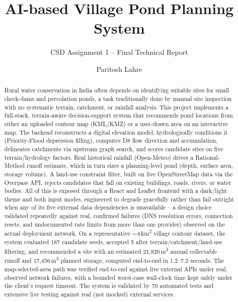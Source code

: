\documentclass[manuscript,screen]{acmart}
\begin{document}
\title{AI-based Village Pond Planning System}
\subtitle{CSD Assignment 1 -- Final Technical Report}

\author{Paritosh Lahre}

\renewcommand{\shortauthors}{Lahre}

\begin{abstract}
Rural water conservation in India often depends on identifying suitable
sites for small check-dams and percolation ponds, a task traditionally
done by manual site inspection with no systematic terrain, catchment, or
rainfall analysis. This project implements a full-stack, terrain-aware
decision-support system that recommends pond locations from either an
uploaded contour map (KML/KMZ) or a user-drawn area on an interactive map.
The backend reconstructs a digital elevation model, hydrologically
conditions it (Priority-Flood depression filling), computes D8 flow
direction and accumulation, delineates catchments via upstream graph
search, and scores candidate sites on five terrain/hydrology factors. Real
historical rainfall (Open-Meteo) drives a Rational-Method runoff estimate,
which in turn sizes a planning-level pond (depth, surface area, storage
volume). A land-use constraint filter, built on live OpenStreetMap data via
the Overpass API, rejects candidates that fall on existing buildings,
roads, rivers, or water bodies. All of this is exposed through a React and
Leaflet frontend with a dark/light theme and both input modes, engineered
to degrade gracefully rather than fail outright when any of its five
external data dependencies is unavailable -- a design choice validated
repeatedly against real, confirmed failures (DNS resolution errors,
connection resets, and undocumented rate limits from more than one
provider) observed on the actual deployment network. On a representative
$\sim$4\,km\textsuperscript{2} village contour dataset, the system
evaluated 187 candidate seeds, accepted 5 after terrain/catchment/land-use
filtering, and recommended a site with an estimated 21{,}820\,m\textsuperscript{3}
annual collectable runoff and 17{,}456\,m\textsuperscript{3} planned
storage, computed end-to-end in 1.2--7.2 seconds. The map-selected-area
path was verified end-to-end against live external APIs under real,
observed network failures, with a bounded worst-case wall-clock time kept
safely under the client's request timeout. The system is validated by 70
automated tests and extensive live testing against real (not mocked)
external services.
\end{abstract}
\end{document}
